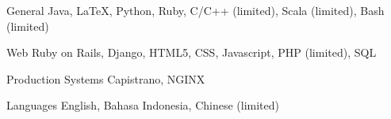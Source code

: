 


\begin{cvskills}


	\cvskill
	{General}
	{Java, LaTeX, Python, Ruby, C/C++ (limited), Scala (limited), Bash (limited)}


	\cvskill
	{Web}
	{Ruby on Rails, Django, HTML5, CSS, Javascript, PHP (limited), SQL}


	\cvskill
	{Production Systems}
	{Capistrano, NGINX}


	\cvskill
	{Languages}
	{English, Bahasa Indonesia, Chinese (limited)}


\end{cvskills}
